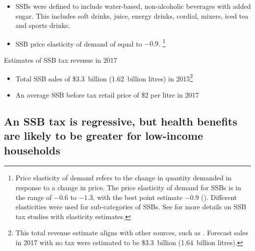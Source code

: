 \documentclass[embargoed]{grattan}
\begin{document}
\begin{itemize}
\item
  SSBs were defined to include water-based, non-alcoholic beverages with added sugar.
This includes soft drinks, juice, energy drinks, cordial, mixers, iced tea and sports drinks.
\item
  SSB price elasticity of demand of equal to \(-0.9\).%
\footnote{Price elasticity of demand refers to the change in quantity demanded in response to a change in price.
The price elasticity of demand for SSBs is in the range of \(-0.6\) to \(-1.3\), with the best point estimate \(-0.9\) (\textcites{Andreyeva2010impactfoodprices}{Block2010Pointpurchaseprice}{Sharma2014effectstaxingsugarsweetened}{Yang2016child}{Lineffectssugarsweetened}{Powell2013Assessingpotentialeffectiveness}{Bahl2003uneasycasediscriminatory}{Miao2013Accountingproductsubstitution}{Escobar2013Evidencethattax}).
Different elasticities were used for sub-categories of SSBs.
See  for more details on SSB tax studies with elasticity estimates.}
\end{itemize}

\begin{table}
\caption{Estimates of SSB tax revenue in 2017}\label{tbl:Estimates-of-SSB-tax-revenue-2017}




\end{table}

\begin{itemize}
\item
  Total SSB sales of \$3.3~billion (1.62~billion litres) in 2015\footnote{This total revenue estimate aligns with other sources, such as \textcite{Levy2014QuenchingAustraliasthirst}.
Forecast sales in 2017 with no tax were estimated to be \$3.3~billion (1.64~billion litres).}
\item
  An average SSB before tax retail price of \$2 per litre in 2017
\end{itemize}

\subsection{An SSB tax is regressive, but health benefits are likely to be greater for low-income households}\label{an-ssb-tax-is-regressive-but-health-benefits-are-likely-to-be-greater-for-low-income-households}
\end{document}
